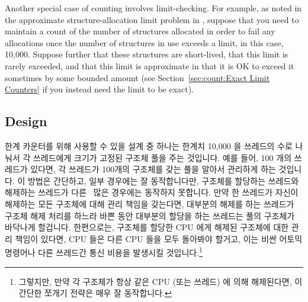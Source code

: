 Another special case of counting involves limit-checking.
For example, as noted in the approximate structure-allocation limit
problem in {\QQapproxcnt},
suppose that you need to maintain a count of the number of
structures allocated in order to fail any allocations once the number
of structures in use exceeds a limit, in this case, 10,000.
Suppose further that these structures are short-lived, that this
limit is rarely exceeded, and that this limit is approximate in
that it is OK to exceed it sometimes by some bounded amount
(see Section~\ref{sec:count:Exact Limit Counters}
if you instead need the limit to be exact).
\fi

\subsection{Design}

한계 카운터를 위해 사용할 수 있을 설계 중 하나는 한계치 10,000 을 쓰레드의 수로
나눠서 각 쓰레드에게 크기가 고정된 구조체 풀을 주는 것입니다.
예를 들어, 100 개의 쓰레드가 있다면, 각 쓰레드가 100개의 구조체를 갖는 풀을
알아서 관리하게 하는 것입니다.
이 방법은 간단하고, 일부 경우에는 잘 동작합니다만, 구조체를 할당하는 쓰레드와
해제하는 쓰레드가 다른~\cite{McKenney93} 많은 경우에는 동작하지 못합니다.
만약 한 쓰레드가 자신이 해제하는 모든 구조체에 대해 관리 책임을 갖는다면,
대부분의 해제를 하는 쓰레드가 구조체 해제 처리를 하느라 바쁜 동안 대부분의
할당을 하는 쓰레드는 풀의 구조체가 바닥나게 할겁니다.
한편으로는, 구조체를 할당한 CPU 에게 해제된 구조체에 대한 관리 책임이 있다면,
CPU 들은 다른 CPU 들을 모두 돌아봐야 할거고, 이는 비싼 어토믹 명령어나 다른
쓰레드간 통신 비용을 발생시킬 것입니다.\footnote{
	그렇지만, 만약 각 구조체가 항상 같은 CPU (또는 쓰레드) 에 의해
	해제된다면, 이 간단한 쪼개기 전략은 매우 잘 동작합니다.}

